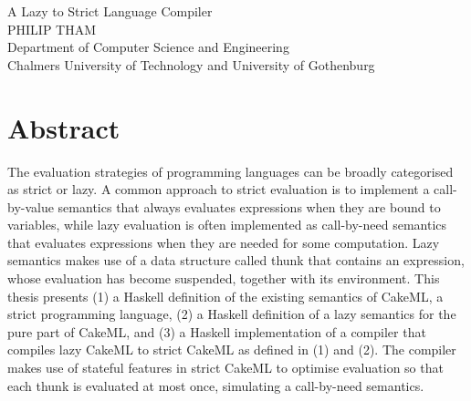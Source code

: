 \noindent
A Lazy to Strict Language Compiler\\
PHILIP THAM\\
Department of Computer Science and Engineering\\
Chalmers University of Technology and University of Gothenburg \setlength{\parskip}{0.5cm}

\thispagestyle{plain}
\setlength{\parskip}{0pt plus 1.0pt}

\section*{Abstract}
  The evaluation strategies of programming languages can be broadly categorised as strict or lazy.
  A common approach to strict evaluation is to implement a call-by-value semantics
  that always evaluates expressions when they are bound to variables, while lazy
  evaluation is often implemented as call-by-need semantics that evaluates
  expressions when they are needed for some computation. Lazy semantics makes
  use of a data structure called thunk that contains an expression, whose evaluation
  has become suspended, together with its environment. This thesis presents
  (1) a Haskell definition of the existing semantics of CakeML, a strict programming
  language, (2) a Haskell definition of a lazy semantics for the pure part
  of CakeML, and (3) a Haskell implementation of a compiler that compiles lazy
  CakeML to strict CakeML as defined in (1) and (2). The compiler makes
  use of stateful features in strict CakeML to optimise evaluation so that each
  thunk is evaluated at most once, simulating a call-by-need semantics.


\newpage				%
\thispagestyle{empty}
\mbox{}
